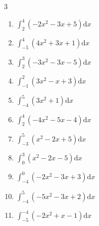 \begin{multicols}{3}
\begin{enumerate}
  \item $\displaystyle \int_{2}^{4}\left( -2x^{2}-3x+5 \right) \mathrm{d}x$


\columnbreak %

  \item $\displaystyle \int_{-5}^{4}\left( 4x^{2}+3x+1 \right) \mathrm{d}x$

        \phantom{$\displaystyle =240$}

  \item $\displaystyle \int_{2}^{3}\left( -3x^{2}-3x-5 \right) \mathrm{d}x$


  \item $\displaystyle \int_{-1}^{2}\left( 3x^{2}-x+3 \right) \mathrm{d}x$

        \phantom{$\displaystyle =9$}

  \item $\displaystyle \int_{-4}^{5}\left( 3x^{2}+1 \right) \mathrm{d}x$


  \item $\displaystyle \int_{2}^{4}\left( -4x^{2}-5x-4 \right) \mathrm{d}x$

        \phantom{$\displaystyle =-106$}

\columnbreak %

  \item $\displaystyle \int_{-3}^{5}\left( x^{2}-2x+5 \right) \mathrm{d}x$


  \item $\displaystyle \int_{0}^{3}\left( x^{2}-2x-5 \right) \mathrm{d}x$


  \item $\displaystyle \int_{-4}^{0}\left( -2x^{2}-3x+3 \right) \mathrm{d}x$


  \item $\displaystyle \int_{-4}^{5}\left( -5x^{2}-3x+2 \right) \mathrm{d}x$


  \item $\displaystyle \int_{-5}^{-4}\left( -2x^{2}+x-1 \right) \mathrm{d}x$


\end{enumerate}
\end{multicols}
